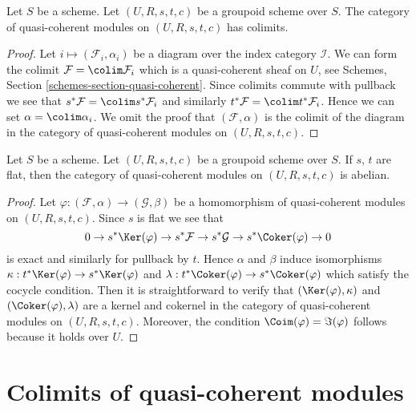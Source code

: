 \begin{lemma}
\label{lemma-colimits}
Let $S$ be a scheme. Let $(U, R, s, t, c)$ be a groupoid scheme over $S$.
The category of quasi-coherent modules on $(U, R, s, t, c)$ has colimits.
\end{lemma}

\begin{proof}
Let $i \mapsto (\mathcal{F}_i, \alpha_i)$ be a diagram over the index
category $\mathcal{I}$. We can form the colimit
$\mathcal{F} = \colim \mathcal{F}_i$
which is a quasi-coherent sheaf on $U$, see
Schemes, Section \ref{schemes-section-quasi-coherent}.
Since colimits commute with pullback we see that
$s^*\mathcal{F} = \colim s^*\mathcal{F}_i$ and similarly
$t^*\mathcal{F} = \colim t^*\mathcal{F}_i$. Hence we can set
$\alpha = \colim \alpha_i$. We omit the proof that $(\mathcal{F}, \alpha)$
is the colimit of the diagram in the category of quasi-coherent modules
on $(U, R, s, t, c)$.
\end{proof}

\begin{lemma}
\label{lemma-abelian}
Let $S$ be a scheme.
Let $(U, R, s, t, c)$ be a groupoid scheme over $S$.
If $s$, $t$ are flat, then the category of quasi-coherent modules on
$(U, R, s, t, c)$ is abelian.
\end{lemma}

\begin{proof}
Let $\varphi : (\mathcal{F}, \alpha) \to (\mathcal{G}, \beta)$ be a
homomorphism of quasi-coherent modules on $(U, R, s, t, c)$. Since
$s$ is flat we see that
$$
0 \to s^*\Ker(\varphi)
\to s^*\mathcal{F} \to s^*\mathcal{G} \to s^*\Coker(\varphi) \to 0
$$
is exact and similarly for pullback by $t$. Hence $\alpha$ and $\beta$
induce isomorphisms
$\kappa : t^*\Ker(\varphi) \to s^*\Ker(\varphi)$ and
$\lambda : t^*\Coker(\varphi) \to s^*\Coker(\varphi)$
which satisfy the cocycle condition. Then it is straightforward to
verify that $(\Ker(\varphi), \kappa)$ and
$(\Coker(\varphi), \lambda)$ are a kernel and cokernel in the
category of quasi-coherent modules on $(U, R, s, t, c)$. Moreover,
the condition $\Coim(\varphi) = \Im(\varphi)$ follows
because it holds over $U$.
\end{proof}













\section{Colimits of quasi-coherent modules}
\label{section-colimits}

